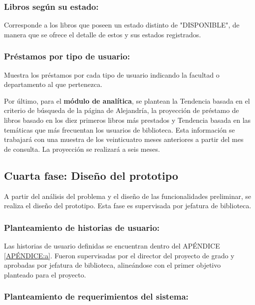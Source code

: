 \documentclass[spanish]{ieee_upb}
\begin{document}
\subsubsection{Libros según su estado: } Corresponde a los libros que poseen un estado distinto de "DISPONIBLE", de manera que se ofrece el detalle de estos y sus estados registrados.
\subsubsection{Préstamos por tipo de usuario:} Muestra los préstamos por cada tipo de usuario indicando la facultad o departamento al que pertenezca.

\vspace{0.3cm}
Por último, para el \textbf{módulo de analítica}, se plantean la Tendencia basada en el criterio de búsqueda de la página de Alejandría, la proyección de préstamo de libros basado en los diez primeros libros más prestados y Tendencia basada en las temáticas que más frecuentan los usuarios de biblioteca. Esta información se trabajará con una muestra de los veinticuatro meses anteriores a partir del mes de consulta. La proyección se realizará a seis meses.

\vspace{0.3cm}
\subsection{Cuarta fase: Diseño del prototipo}

A partir del análisis del problema y el diseño de las funcionalidades preliminar, se realiza el diseño del prototipo. Esta fase es supervisada por jefatura de biblioteca.

\subsubsection{Planteamiento de historias de usuario: }

Las historias de usuario definidas se encuentran dentro del APÉNDICE \ref{APÉNDICE:a}. Fueron supervisadas por el director del proyecto de grado y aprobadas por jefatura de biblioteca, alineándose con el primer objetivo planteado para el proyecto.

\subsubsection{Planteamiento de requerimientos del sistema: }
\end{document}
